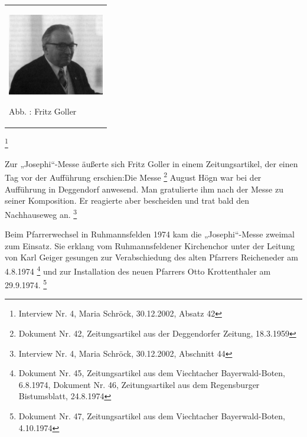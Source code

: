 \begin{center}
\begin{minipage}{4.598cm}
\begin{flushleft}
\tablefirsthead{}
\tablehead{}
\tabletail{}
\tablelasttail{}
\begin{supertabular}{m{4.3980002cm}}

\includegraphics[width=4.216cm,height=3.577cm]{pictures/zulassungsarbeit-img107.jpg}

Abb. : Fritz Goller \\
\end{supertabular}
\end{flushleft}
\end{minipage}
\end{center}




\footnote{
Interview Nr. 4, Maria Schröck, 30.12.2002, Absatz 42}

Zur „Josephi“-Messe äußerte sich Fritz Goller in einem Zeitungsartikel,
der einen Tag vor der Aufführung erschien:\zitat{ }Die
Messe \footnote{Dokument
Nr. 42, Zeitungsartikel aus der Deggendorfer Zeitung, 18.3.1959} August
Högn war bei der Aufführung in Deggendorf anwesend. Man gratulierte ihm
nach der Messe zu seiner Komposition. Er reagierte aber bescheiden und
trat bald den Nachhauseweg an. \footnote{Interview Nr. 4, Maria
Schröck, 30.12.2002, Abschnitt 44}

Beim Pfarrerwechsel in Ruhmannsfelden 1974 kam die „Josephi“-Messe
zweimal zum Einsatz. Sie erklang vom Ruhmannsfeldener Kirchenchor unter
der Leitung von Karl Geiger gesungen zur Verabschiedung des alten
Pfarrers Reicheneder am 4.8.1974 \footnote{Dokument Nr. 45,
Zeitungsartikel aus dem Viechtacher Bayerwald-Boten, 6.8.1974, Dokument
Nr. 46, Zeitungsartikel aus dem Regensburger Bistumsblatt, 24.8.1974}
und zur Installation des neuen Pfarrers Otto Krottenthaler am
29.9.1974. \footnote{Dokument Nr. 47, Zeitungsartikel aus dem
Viechtacher Bayerwald-Boten, 4.10.1974}

